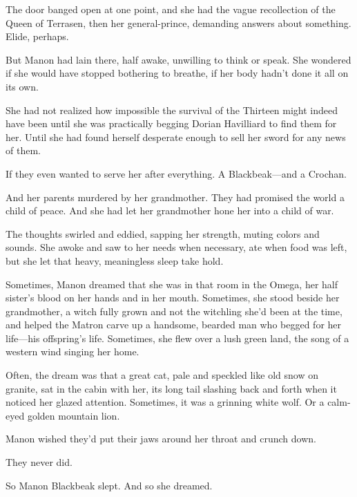 The door banged open at one point, and she had the vague recollection of the Queen of Terrasen, then her general-prince, demanding answers about something. Elide, perhaps.

But Manon had lain there, half awake, unwilling to think or speak. She wondered if she would have stopped bothering to breathe, if her body hadn't done it all on its own.

She had not realized how impossible the survival of the Thirteen might indeed have been until she was practically begging Dorian Havilliard to find them for her. Until she had found herself desperate enough to sell her sword for any news of them.

If they even wanted to serve her after everything. A Blackbeak---and a Crochan.

And her parents  murdered by her grandmother. They had promised the world a child of peace. And she had let her grandmother hone her into a child of war.

The thoughts swirled and eddied, sapping her strength, muting colors and sounds. She awoke and saw to her needs when necessary, ate when food was left, but she let that heavy, meaningless sleep take hold.

Sometimes, Manon dreamed that she was in that room in the Omega, her half sister's blood on her hands and in her mouth. Sometimes, she stood beside her grandmother, a witch fully grown and not the witchling she'd been at the time, and helped the Matron carve up a handsome, bearded man who begged for her life---his offspring's life. Sometimes, she flew over a lush green land, the song of a western wind singing her home.

Often, the dream was that a great cat, pale and speckled like old snow on granite, sat in the cabin with her, its long tail slashing back and forth when it noticed her glazed attention. Sometimes, it was a grinning white wolf. Or a calm-eyed golden mountain lion.

Manon wished they'd put their jaws around her throat and crunch down.

They never did.

So Manon Blackbeak slept. And so she dreamed.
